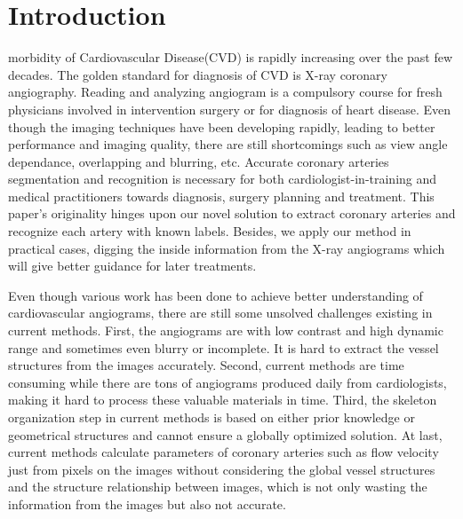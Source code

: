 \documentclass[journal]{IEEEtran}
\begin{document}
%
\IEEEpeerreviewmaketitle



\section{Introduction}
%
%
%
%
 morbidity of Cardiovascular Disease(CVD) is rapidly increasing over the past few decades. The golden standard for diagnosis of CVD is X-ray coronary angiography. Reading and analyzing angiogram is a compulsory course for fresh physicians involved in intervention surgery or for diagnosis of heart disease. Even though the imaging techniques have been developing rapidly, leading to better performance and imaging quality, there are still shortcomings such as view angle dependance, overlapping and blurring, etc. Accurate coronary arteries segmentation and recognition is necessary for both cardiologist-in-training and medical practitioners towards diagnosis, surgery planning and treatment. This paper's originality hinges upon our novel solution to extract coronary arteries and recognize each artery with known labels. Besides, we apply our method in practical cases, digging the inside information from the X-ray angiograms which will give better guidance for later treatments.

Even though various work has been done to achieve better understanding of cardiovascular angiograms, there are still some unsolved challenges existing in current methods. First, the angiograms are with low contrast and high dynamic range and sometimes even blurry or incomplete. It is hard to extract the vessel structures from the images accurately. Second, current methods are time consuming while there are tons of angiograms produced daily from cardiologists, making it hard to process these valuable materials in time. Third, the skeleton organization step in current methods is based on either prior knowledge or geometrical structures and cannot ensure a globally optimized solution. At last, current methods calculate parameters of coronary arteries such as flow velocity just from pixels on the images without considering  the global vessel structures and the structure relationship between images, which is not only wasting the information from the images but also not accurate.
\end{document}
